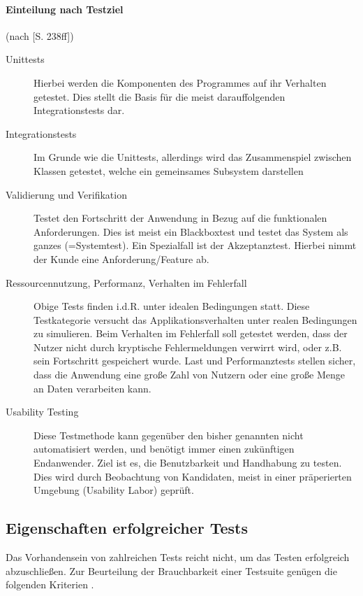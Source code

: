 \paragraph{Einteilung nach Testziel} (nach \cite{hunt_pragmatic_1999}[S. 238ff])
\begin{description}
 \item[Unittests] Hierbei werden die Komponenten des Programmes auf ihr Verhalten getestet. Dies stellt die Basis für die meist darauffolgenden Integrationstests dar.
 \item[Integrationstests] Im Grunde wie die Unittests, allerdings wird das Zusammenspiel zwischen Klassen getestet, welche ein gemeinsames Subsystem darstellen
 \item[Validierung und Verifikation] Testet den Fortschritt der Anwendung in Bezug auf die funktionalen Anforderungen. Dies ist meist ein Blackboxtest und testet das System als ganzes (=Systemtest). Ein Spezialfall ist der Akzeptanztest. Hierbei nimmt der Kunde eine Anforderung/Feature ab.
 \item[Ressourcennutzung, Performanz, Verhalten im Fehlerfall] Obige Tests finden i.d.R. unter idealen Bedingungen statt. Diese Testkategorie versucht das Applikationsverhalten unter realen Bedingungen zu simulieren. Beim Verhalten im Fehlerfall soll getestet werden, dass der Nutzer nicht durch kryptische Fehlermeldungen verwirrt wird, oder z.B. sein Fortschritt gespeichert wurde. Last und Performanztests stellen sicher, dass die Anwendung eine große Zahl von Nutzern oder eine große Menge an Daten verarbeiten kann.
 \item[Usability Testing] Diese Testmethode kann gegenüber den bisher genannten nicht automatisiert werden, und benötigt immer einen zukünftigen Endanwender. Ziel ist es, die Benutzbarkeit und Handhabung zu testen. Dies wird durch Beobachtung von Kandidaten, meist in einer präperierten Umgebung (Usability Labor) geprüft.
\end{description}




\subsection{Eigenschaften erfolgreicher Tests}

Das Vorhandensein von zahlreichen Tests reicht nicht, um das Testen erfolgreich abzuschließen. Zur Beurteilung der Brauchbarkeit einer Testsuite genügen die folgenden Kriterien \cite[S.272-279]{rappin_rails_2011}.

